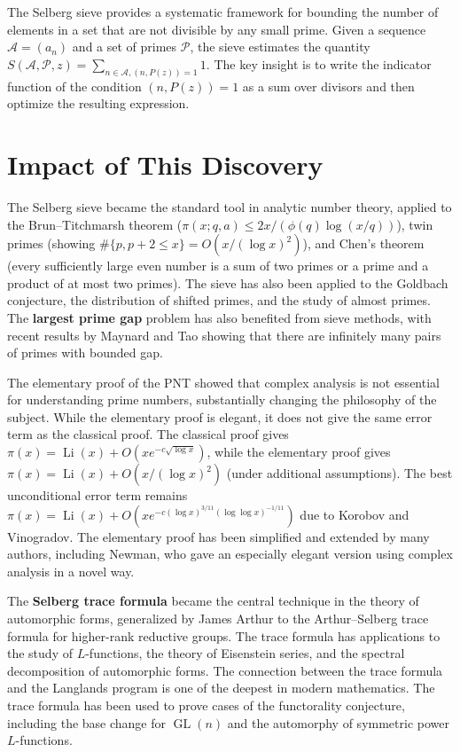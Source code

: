The Selberg sieve provides a systematic framework for bounding the number of elements in a set that are not divisible by any small prime. Given a sequence $\mathcal{A} = (a_n)$ and a set of primes $\mathcal{P}$, the sieve estimates the quantity $S(\mathcal{A}, \mathcal{P}, z) = \sum_{n \in \mathcal{A}, (n, P(z))=1} 1$. The key insight is to write the indicator function of the condition $(n, P(z)) = 1$ as a sum over divisors and then optimize the resulting expression.

\section{Impact of This Discovery}

The Selberg sieve became the standard tool in analytic number theory, applied to the Brun--Titchmarsh theorem ($\pi(x;q,a) \leq 2x/(\phi(q)\log(x/q))$), twin primes (showing $\#\{p, p+2 \leq x\} = O(x/(\log x)^2)$), and Chen's theorem (every sufficiently large even number is a sum of two primes or a prime and a product of at most two primes). The sieve has also been applied to the Goldbach conjecture, the distribution of shifted primes, and the study of almost primes. The \textbf{largest prime gap} problem has also benefited from sieve methods, with recent results by Maynard and Tao showing that there are infinitely many pairs of primes with bounded gap.

The elementary proof of the PNT showed that complex analysis is not essential for understanding prime numbers, substantially changing the philosophy of the subject. While the elementary proof is elegant, it does not give the same error term as the classical proof. The classical proof gives $\pi(x) = \operatorname{Li}(x) + O(x e^{-c\sqrt{\log x}})$, while the elementary proof gives $\pi(x) = \operatorname{Li}(x) + O(x/(\log x)^2)$ (under additional assumptions). The best unconditional error term remains $\pi(x) = \operatorname{Li}(x) + O(x e^{-c(\log x)^{3/11}(\log \log x)^{-1/11}})$ due to Korobov and Vinogradov. The elementary proof has been simplified and extended by many authors, including Newman, who gave an especially elegant version using complex analysis in a novel way.

The \textbf{Selberg trace formula} became the central technique in the theory of automorphic forms, generalized by James Arthur to the Arthur--Selberg trace formula for higher-rank reductive groups. The trace formula has applications to the study of $L$-functions, the theory of Eisenstein series, and the spectral decomposition of automorphic forms. The connection between the trace formula and the Langlands program is one of the deepest in modern mathematics. The trace formula has been used to prove cases of the functorality conjecture, including the base change for $\operatorname{GL}(n)$ and the automorphy of symmetric power $L$-functions.

